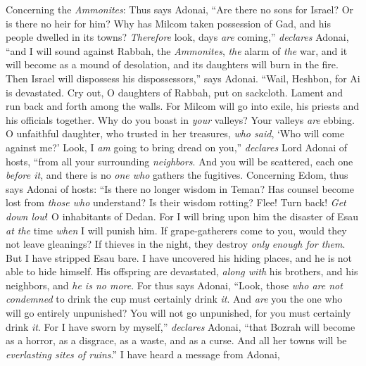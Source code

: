 \begin{biblechapter} %
 Concerning the \textit{Ammonites}: Thus says Adonai,
\verse “Are there no sons for Israel? 
Or is there no heir for him? 
Why has Milcom taken possession of Gad, 
and his people dwelled in its towns?
\verse \textit{Therefore} look, days \textit{are} coming,” \textit{declares} Adonai, 
“and I will sound against Rabbah, the \textit{Ammonites}, 
\textit{the} alarm of \textit{the} war, 
and it will become as a mound of desolation, 
and its daughters will burn in the fire. 
Then Israel will dispossess his dispossessors,” says Adonai.
\verse “Wail, Heshbon, for Ai is devastated. 
Cry out, O daughters of Rabbah, put on sackcloth. 
Lament and run back and forth among the walls. 
For Milcom will go into exile, 
his priests and his officials together.
\verse Why do you boast in \textit{your} valleys? 
Your valleys \textit{are} ebbing. 
O unfaithful daughter, who trusted in her treasures, 
\textit{who said}, ‘Who will come against me?’
\verse Look, I \textit{am} going to bring dread on you,” 
\textit{declares} Lord Adonai of hosts, 
“from all your surrounding \textit{neighbors}. 
And you will be scattered, 
each one \textit{before it}, 
and there is no \textit{one who} gathers the fugitives.
 Concerning Edom, thus says Adonai of hosts:
\verse “Is there no longer wisdom in Teman? 
Has counsel become lost from \textit{those who} understand? 
Is their wisdom rotting?
\verse Flee! Turn back! \textit{Get down low}! 
O inhabitants of Dedan. 
For I will bring upon him the disaster of Esau 
\textit{at the} time \textit{when} I will punish him.
\verse If grape-gatherers come to you, 
would they not leave gleanings? 
If thieves in the night, 
they destroy \textit{only} \textit{enough for them}.
\verse But I have stripped Esau bare. 
I have uncovered his hiding places, 
and he is not able to hide himself. 
His offspring are devastated, \textit{along with} his brothers, 
and his neighbors, and \textit{he is no more}.
\verse For thus says Adonai, “Look, those \textit{who are not condemned} to drink the cup must certainly drink \textit{it}. And \textit{are} you the one who will go entirely unpunished? You will not go unpunished, for you must certainly drink \textit{it}.
\verse For I have sworn by myself,” \textit{declares} Adonai, “that Bozrah will become as a horror, as a disgrace, as a waste, and as a curse. And all her towns will be \textit{everlasting sites of ruins}.”
\verse I have heard a message from Adonai, 

\end{biblechapter}
